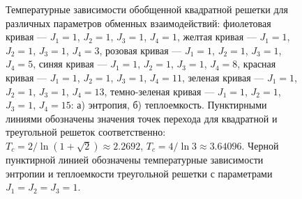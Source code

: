 \documentclass[utf8,12pt]{jetp}
\begin{document}
\begin{figure}[h]
	\begin{minipage}[h]{0.5\linewidth}
	\end{minipage}
	\hfill
	\begin{minipage}[h]{0.5\linewidth}
	\end{minipage}
	\caption{Температурные зависимости обобщенной квадратной решетки для различных параметров обменных взаимодействий: фиолетовая кривая --- $J_1 = 1$, $J_2 = 1$, $J_3 = 1$, $J_4 = 1$, желтая кривая --- $J_1 = 1$, $J_2 = 1$, $J_3 = 1$, $J_4 = 3$, розовая кривая --- $J_1 = 1$, $J_2 = 1$, $J_3 = 1$, $J_4 = 5$, синяя кривая --- $J_1 = 1$, $J_2 = 1$, $J_3 = 1$, $J_4 = 8$, красная кривая --- $J_1 = 1$, $J_2 = 1$, $J_3 = 1$, $J_4 = 11$, зеленая кривая --- $J_1 = 1$, $J_2 = 1$, $J_3 = 1$, $J_4 = 13$, темно-зеленая кривая --- $J_1 = 1$, $J_2 = 1$, $J_3 = 1$, $J_4 = 15$: а) энтропия, б) теплоемкость. Пунктирными линиями обозначены значения точек перехода для квадратной и треугольной решеток соответственно: $T_c = 2/\ln(1+\sqrt{2})\approx 2.2692$,  $T_c = 4/\ln 3\approx 3.64096$. Черной пунктирной линией обозначены температурные зависимости энтропии и теплоемкости треугольной решетки с параметрами $J_1 = J_2 = J_3 = 1$.}
	\label{Triangular}
\end{figure}
\end{document}
